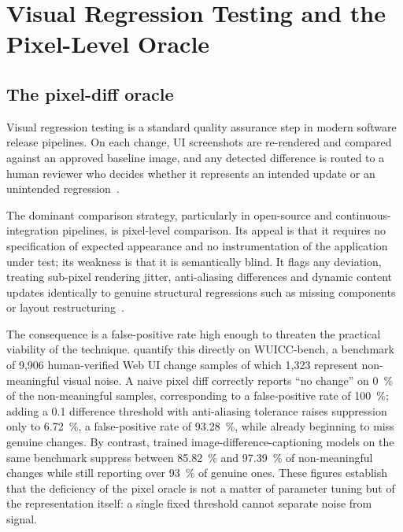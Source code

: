 \section{Visual Regression Testing and the Pixel-Level Oracle}
\label{sec:vrt}

\subsection{The pixel-diff oracle}
\label{sec:vrt-oracle}

Visual regression testing is a standard quality assurance step in modern
software release pipelines. On each change, UI screenshots are re-rendered
and compared against an approved baseline image, and any detected
difference is routed to a human reviewer who decides whether it represents
an intended update or an unintended regression~\citep{zhang2026beyond}.

The dominant comparison strategy, particularly in open-source and
continuous-integration pipelines, is pixel-level comparison. Its appeal is
that it requires no specification of expected appearance and no
instrumentation of the application under test; its weakness is that it is
semantically blind. It flags any deviation, treating sub-pixel rendering
jitter, anti-aliasing differences and dynamic content updates identically
to genuine structural regressions such as missing components or layout
restructuring~\citep{zhang2026beyond}.

The consequence is a false-positive rate high enough to threaten the
practical viability of the technique. \citet{zhang2026beyond}
quantify this directly on WUICC-bench, a benchmark of 9{,}906
human-verified Web UI change samples of which 1{,}323 represent
non-meaningful visual noise. A naive pixel diff correctly reports
``no change'' on \SI{0}{\percent} of the non-meaningful samples,
corresponding to a false-positive rate of \SI{100}{\percent}; adding a
0.1 difference threshold with anti-aliasing tolerance raises suppression
only to \SI{6.72}{\percent}, a false-positive rate of
\SI{93.28}{\percent}, while already beginning to miss genuine changes.
By contrast, trained image-difference-captioning models on the same
benchmark suppress between \SI{85.82}{\percent} and \SI{97.39}{\percent}
of non-meaningful changes while still reporting over \SI{93}{\percent} of
genuine ones. These figures establish that the deficiency of the pixel
oracle is not a matter of parameter tuning but of the representation
itself: a single fixed threshold cannot separate noise from signal.

